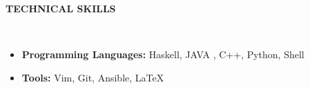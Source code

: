\documentclass[a4paper,10pt]{article}
\newcommand{\lsep}{-0.5cm}
\newcommand{\resheading}[1]{{\small \colorbox{mygrey}{\begin{minipage}{0.975\textwidth}{\textbf{#1 \vphantom{p\^{E}}}}\end{minipage} \hspace{0.2cm}}}}
\begin{document}
\resheading{\textbf{TECHNICAL SKILLS} }\\[\lsep]
\begin{itemize} [leftmargin=1.25cm]
	\item \noindent \textbf{Programming Languages:} Haskell, JAVA , C++, Python, Shell
	\item \textbf{Tools:} Vim, Git, Ansible, \LaTeX

\end{itemize}
\end{document}

